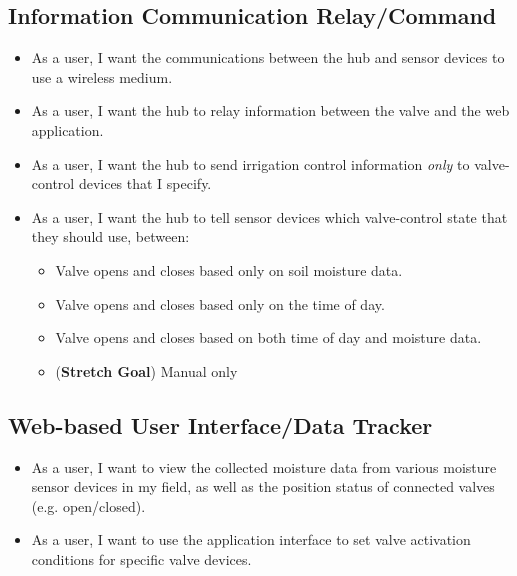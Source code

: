 \documentclass[onecolumn, draftclsnofoot,10pt, compsoc]{IEEEtran}
\begin{document}
	\subsection{Information Communication Relay/Command}
	\begin{itemize}
		\item{As a user, I want the communications between the hub and sensor devices to use a wireless medium.}
		\item{As a user, I want the hub to relay information between the valve and the web application.}
		\item{As a user, I want the hub to send irrigation control information \textit{only} to valve-control devices that I specify.}
		\item{As a user, I want the hub to tell sensor devices which valve-control state that they should use, between:}
		\begin{itemize}
			\item{Valve opens and closes based only on soil moisture data.}
			\item{Valve opens and closes based only on the time of day.}
			\item{Valve opens and closes based on both time of day and moisture data.} 
			\item{(\textbf{Stretch Goal}) Manual only}
		\end{itemize}
	\end{itemize}
	
	\subsection{Web-based User Interface/Data Tracker}
	\begin{itemize}
		\item{As a user, I want to view the collected moisture data from various moisture sensor devices in my field, as well as the position status of connected valves (e.g. open/closed).}
		\item{As a user, I want to use the application interface to set valve activation conditions for specific valve devices.}
	\end{itemize}    
\end{document}
